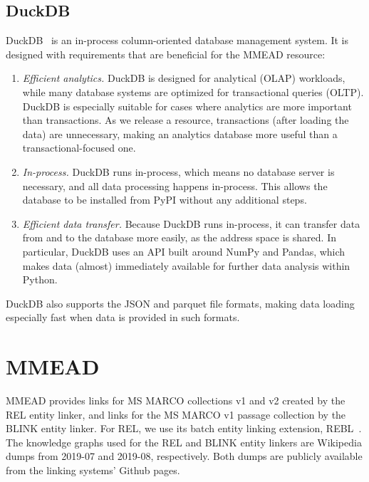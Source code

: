 \subsection{DuckDB}
DuckDB~\citep{duckdb} is an in-process column-oriented database management system. It is designed with requirements that are beneficial for the MMEAD resource:
\begin{enumerate}
    \item \emph{Efficient analytics.} DuckDB is designed for analytical (OLAP) workloads, while many database systems are optimized for transactional queries (OLTP). DuckDB is especially suitable for cases where analytics are more important than transactions. As we release a resource, transactions (after loading the data) are unnecessary, making an analytics database more useful than a transactional-focused one. 
	\item \emph{In-process.} DuckDB runs in-process, which means no database server is necessary, and all data processing happens in-process. This allows the database to be installed from PyPI without any additional steps. 
	\item \emph{Efficient data transfer.} Because DuckDB runs in-process, it can transfer data from and to the database more easily, as the address space is shared. In particular, DuckDB uses an API built around NumPy and Pandas, which makes data (almost) immediately available for further data analysis within Python. 
\end{enumerate}
DuckDB also supports the JSON and parquet file formats, making data loading especially fast when data is provided in such formats.

\section{MMEAD}
MMEAD provides links for MS MARCO collections v1 and v2 created by the REL entity linker, and links for the MS MARCO v1 passage collection by the BLINK entity linker. For REL, we use its batch entity linking extension, REBL~\citep{rebl}. The knowledge graphs used for the REL and BLINK entity linkers are Wikipedia dumps from 2019-07 and 2019-08, respectively. Both dumps are publicly available from the linking systems' Github pages. 

